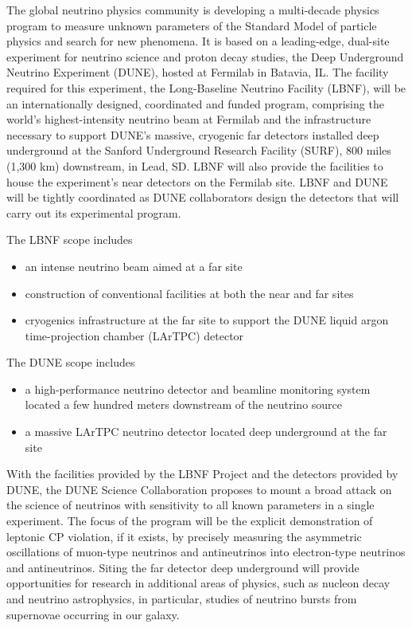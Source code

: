 

The global neutrino physics community is developing a multi-decade physics program to measure unknown parameters of the Standard Model of particle physics and search for new phenomena.   It is based on a leading-edge, dual-site experiment
for neutrino science and proton decay studies, the Deep Underground Neutrino Experiment 
(DUNE), hosted at Fermilab in Batavia, IL. The facility required for this experiment, the Long-Baseline 
Neutrino Facility (LBNF), will be an internationally designed, coordinated and funded program, comprising 
the world's highest-intensity neutrino beam at Fermilab and the infrastructure necessary to support 
DUNE's massive, cryogenic far detectors installed deep underground at the Sanford Underground 
Research Facility (SURF), 800 miles (1,300 km) downstream, in Lead, SD. LBNF will also provide the 
facilities to house the experiment's near detectors on the Fermilab site. LBNF and DUNE will be tightly coordinated as DUNE collaborators design the detectors that will carry out its experimental program. 
  
The LBNF scope includes 
\begin{itemize}
\item an intense neutrino beam aimed at a far site
\item construction of conventional facilities at both the near and far sites
\item cryogenics infrastructure at the far site to support the DUNE liquid argon time-projection
chamber (LArTPC) detector
\end{itemize}

The DUNE scope includes
\begin{itemize}
\item %
a high-performance neutrino detector and beamline monitoring system located a few hundred meters downstream of the neutrino source
\item a massive LArTPC neutrino detector located deep underground at the far site
\end{itemize}

With the facilities provided by the LBNF Project and the detectors provided by DUNE, the DUNE Science Collaboration proposes to mount a broad attack on the science of neutrinos with sensitivity 
to all known parameters in a single experiment.  The focus of the program will be the explicit 
demonstration of leptonic CP violation, if it exists, by precisely measuring the asymmetric oscillations of 
muon-type neutrinos and antineutrinos into electron-type neutrinos and antineutrinos.
Siting the far detector deep underground will provide
opportunities for research in additional areas of physics, such as nucleon decay and neutrino
astrophysics, in particular, studies of neutrino bursts from supernovae occurring in our galaxy.


